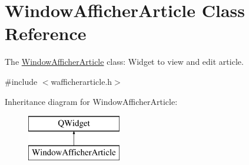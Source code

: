 \hypertarget{class_window_afficher_article}{}\section{Window\+Afficher\+Article Class Reference}
\label{class_window_afficher_article}


The \hyperlink{class_window_afficher_article}{Window\+Afficher\+Article} class\+: Widget to view and edit article.  




{\ttfamily \#include $<$wafficherarticle.\+h$>$}

Inheritance diagram for Window\+Afficher\+Article\+:\begin{figure}[H]
\begin{center}
\leavevmode
\includegraphics[height=2.000000cm]{class_window_afficher_article}
\end{center}
\end{figure}
